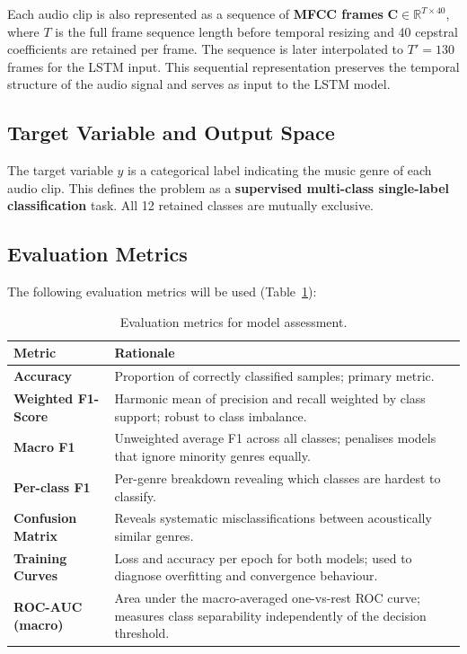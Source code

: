\documentclass[12pt, a4paper]{article}
\begin{document}
Each audio clip is also represented as a sequence of \textbf{MFCC frames} $\mathbf{C}
\in \mathbb{R}^{T \times 40}$, where $T$ is the full frame sequence length before
temporal resizing and 40 cepstral coefficients are retained per frame. The sequence is
later interpolated to $T'=130$ frames for the LSTM input. This sequential representation
preserves the temporal structure of the audio signal and serves as input to the LSTM
model.

\subsection{Target Variable and Output Space}

The target variable $y$ is a categorical label indicating the music genre of each audio
clip. This defines the problem as a \textbf{supervised multi-class single-label
classification} task. All 12 retained classes are mutually exclusive.

\subsection{Evaluation Metrics}

The following evaluation metrics will be used (Table~\ref{tab:metrics}):

\begin{table}[h!]
    \centering
    \caption{Evaluation metrics for model assessment.}
    \label{tab:metrics}
    \begin{tabular}{>{\bfseries}p{4cm} p{9cm}}
        \toprule
        Metric & Rationale \\
        \midrule
        Accuracy & Proportion of correctly classified samples; primary metric. \\[4pt]
        Weighted F1-Score & Harmonic mean of precision and recall weighted by class
                            support; robust to class imbalance. \\[4pt]
        Macro F1 & Unweighted average F1 across all classes; penalises models that
                   ignore minority genres equally. \\[4pt]
        Per-class F1 & Per-genre breakdown revealing which classes are hardest to
                       classify. \\[4pt]
        Confusion Matrix & Reveals systematic misclassifications between acoustically
                           similar genres. \\[4pt]
        Training Curves & Loss and accuracy per epoch for both models; used to diagnose
                          overfitting and convergence behaviour. \\[4pt]
        ROC-AUC (macro) & Area under the macro-averaged one-vs-rest ROC curve; measures
                          class separability independently of the decision threshold. \\
        \bottomrule
    \end{tabular}
\end{table}
\end{document}
